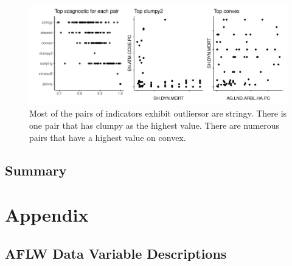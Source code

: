 \begin{Schunk}
\begin{figure}
\includegraphics[width=1\linewidth]{mason-lee-laa-cook_files/figure-latex/wbistatic-1} \caption[Most of the pairs of indicators exhibit outliersor are stringy]{Most of the pairs of indicators exhibit outliersor are stringy. There is one pair that has clumpy as the highest value. There are numerous pairs that have a highest value on convex.}\label{fig:wbistatic}
\end{figure}
\end{Schunk}

\hypertarget{summary}{%
\subsection{Summary}\label{summary}}

\hypertarget{appendix}{%
\section{Appendix}\label{appendix}}

\hypertarget{aflw-data-variable-descriptions}{%
\subsection{AFLW Data Variable
Descriptions}\label{aflw-data-variable-descriptions}}

